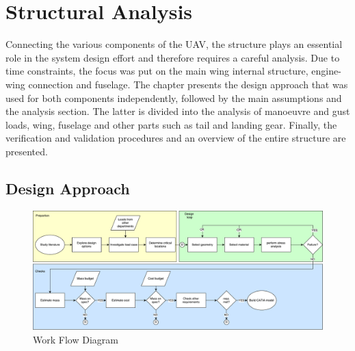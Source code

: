 \chapter{Structural Analysis}
\setlength{\parindent}{15pt}
\label{ch:stru_anal}

Connecting the various components of the UAV, the structure plays an essential role in the system design effort and therefore requires a careful analysis. Due to time constraints, the focus was put on the main wing internal structure, engine-wing connection and fuselage. The chapter presents the design approach that was used for both components independently, followed by the main assumptions and the analysis section. The latter is divided into the analysis of manoeuvre and gust loads, wing, fuselage and other parts such as tail and landing gear. Finally, the verification and validation procedures and an overview of the entire structure are presented.  

\section{Design Approach}
\label{sec:desi_stru}

\begin{figure}[H]
    \centering
    \includegraphics[width=1\textwidth]{Structures/Figures/struct_WFD}
    \caption{Work Flow Diagram}
    \label{fig:stru_WFD}
\end{figure}

